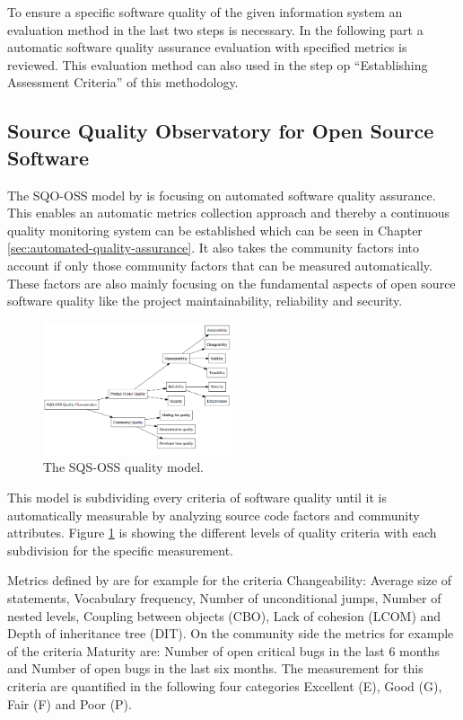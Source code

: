 \documentclass[DIV=calc,paper=a4,fontsize=9pt,twocolumn]{scrartcl}
\begin{document}
To ensure a specific software quality of the given information system an evaluation method in the last two steps is necessary. In the following part a automatic software quality assurance evaluation with specified metrics is reviewed. This evaluation method can also used in the step op \enquote{Establishing Assessment Criteria} of this methodology.

\subsection{Source Quality Observatory for Open Source Software}\label{sec:sqsoss}

The SQO-OSS model by \citet{samoladas2008sqo} is focusing on automated software quality assurance. This enables an automatic metrics collection approach and thereby a continuous quality monitoring system can be established which can be seen in Chapter \ref{sec:automated-quality-assurance}. It also takes the community factors into account if only those community factors that can be measured automatically. These factors are also mainly focusing on the fundamental aspects of open source software quality like the project maintainability, reliability and security. 

\begin{figure}[ht]
    \includegraphics[width=0.5\textwidth ]{img/sqsoss.png}{}
    \centering
    \caption{The SQS-OSS quality model. \citet{samoladas2008sqo}}\label{fig:sqs-oss}
\end{figure}

This model is subdividing every criteria of software quality until it is automatically measurable by analyzing source code factors and community attributes. Figure \ref{fig:sqs-oss} is showing the different levels of quality criteria with each subdivision for the specific measurement. 

Metrics defined by \citet{samoladas2008sqo} are for example for the criteria Changeability: Average size of statements, Vocabulary frequency, Number of unconditional jumps, Number of nested levels, Coupling between objects (CBO), Lack of cohesion (LCOM) and Depth of inheritance tree (DIT). On the community side the metrics for example of the criteria Maturity are: Number of open critical bugs in the last 6 months and Number of open bugs in the last six months. The measurement for this criteria are quantified in the following four categories Excellent (E), Good (G), Fair (F) and Poor (P). \citep{samoladas2008sqo}
\end{document}
